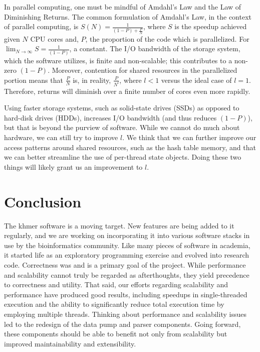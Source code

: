 \documentclass{article}
\begin{document}
In parallel computing, one must be mindful of Amdahl's Law \cite{web:Amdahl}
and the Law of Diminishing Returns. The common formulation of Amdahl's Law, in
the context of parallel computing, is $S(N) = \frac{1}{(1 - P) + \frac{P}{N}}$,
where $S$ is the speedup achieved given $N$ CPU cores and, $P$, the proportion
of the code which is parallelized.  For $\lim_{N\to\infty} S = \frac{1}{(1 -
P)}$, a constant.  The I/O bandwidth of the storage system, which the software
utilizes, is finite and non-scalable; this contributes to a non-zero $(1 - P)$.
Moreover, contention for shared resources in the parallelized portion means
that $\frac{P}{N}$ is, in reality, $\frac{P}{N^l}$, where $l < 1$ versus the
ideal case of $l = 1$.  Therefore, returns will diminish over a finite number
of cores even more rapidly.

Using faster storage systems, such as solid-state drives (SSDs) as opposed to
hard-disk drives (HDDs), increases I/O bandwidth (and thus reduces $(1 - P)$),
but that is beyond the purview of software. While we cannot do much about
hardware, we can still try to improve $l$. We think that we can further improve
our access patterns around shared resources, such as the hash table memory, and
that we can better streamline the use of per-thread state objects. Doing these
two things will likely grant us an improvement to $l$.

\section{Conclusion}

The khmer software is a moving target. New features are being added to it
regularly, and we are working on incorporating it into various software stacks
in use by the bioinformatics community. Like many pieces of software in
academia, it started life as an exploratory programming exercise and evolved
into research code.  Correctness was and is a primary goal of the project.
While performance and scalability cannot truly be regarded as afterthoughts,
they yield precedence to correctness and utility. That said, our efforts
regarding scalability and performance have produced good results, including
speedups in single-threaded execution and the ability to significantly reduce
total execution time by employing multiple threads. Thinking about performance
and scalability issues led to the redesign of the data pump and parser
components. Going forward, these components should be able to benefit not only
from scalability but improved maintainability and extensibility.
\end{document}
